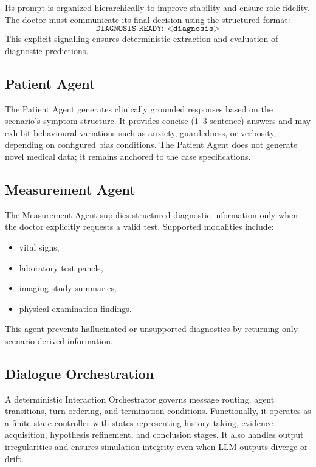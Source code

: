 Its prompt is organized hierarchically to improve stability and ensure role fidelity. The doctor must communicate its final decision using the structured format:
\[
\texttt{DIAGNOSIS READY: <diagnosis>}
\]
This explicit signalling ensures deterministic extraction and evaluation of diagnostic predictions.

\subsection{Patient Agent}

The Patient Agent generates clinically grounded responses based on the scenario’s symptom structure. It provides concise (1–3 sentence) answers and may exhibit behavioural variations such as anxiety, guardedness, or verbosity, depending on configured bias conditions. The Patient Agent does not generate novel medical data; it remains anchored to the case specifications.

\subsection{Measurement Agent}

The Measurement Agent supplies structured diagnostic information only when the doctor explicitly requests a valid test. Supported modalities include:
\begin{itemize}
    \item vital signs,
    \item laboratory test panels,
    \item imaging study summaries,
    \item physical examination findings.
\end{itemize}

This agent prevents hallucinated or unsupported diagnostics by returning only scenario-derived information.

\subsection{Dialogue Orchestration}

A deterministic Interaction Orchestrator governs message routing, agent transitions, turn ordering, and termination conditions. Functionally, it operates as a finite-state controller with states representing history-taking, evidence acquisition, hypothesis refinement, and conclusion stages. It also handles output irregularities and ensures simulation integrity even when LLM outputs diverge or drift.

